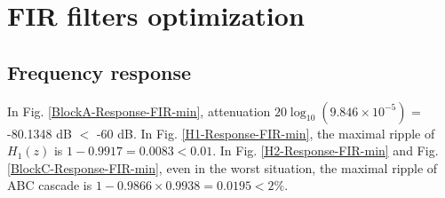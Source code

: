\documentclass{article}
\newenvironment{homeworkProblem}[1]{
	\section{#1}
	}{
}
\newenvironment{homeworkSection}[1]{
	\subsection{#1}
	}{
}
\begin{document}
\begin{homeworkProblem}{FIR filters optimization}
\begin{homeworkSection}{Frequency response}
In Fig. \ref{BlockA-Response-FIR-min}, attenuation $20 \log_{10}(9.846 \times 10^{-5})$ = -80.1348 dB $<$ -60 dB. In Fig. \ref{H1-Response-FIR-min}, the maximal ripple of $H_1(z)$ is $1 - 0.9917 = 0.0083 < 0.01$. In Fig. \ref{H2-Response-FIR-min} and Fig. \ref{BlockC-Response-FIR-min}, even in the worst situation, the maximal ripple of ABC cascade is $1 - 0.9866 \times 0.9938 = 0.0195 < 2\%$.
\end{homeworkSection}


\end{homeworkProblem}

\end{document}
